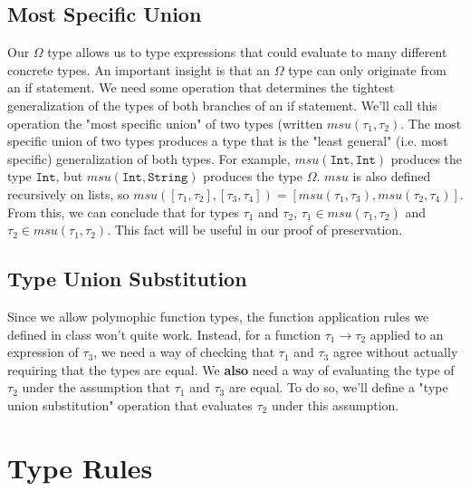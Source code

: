 \documentclass[12pt]{article}
\begin{document}
\subsection{Most Specific Union}
Our $\Omega$ type allows us to type expressions that could evaluate to many different concrete types. An important insight is that an $\Omega$ type can only originate from an if statement. We need some operation that determines the tightest generalization of the types of both branches of an if statement. We'll call this operation the "most specific union" of two types (written $msu(\tau_1, \tau_2)$. The most specific union of two types produces a type that is the "least general" (i.e. most specific) generalization of both types. For example, $msu(\texttt{Int}, \texttt{Int})$ produces the type $\texttt{Int}$, but $msu(\texttt{Int}, \texttt{String})$ produces the type $\Omega$. $msu$ is also defined recursively on lists, so $msu([\tau_1, \tau_2], [\tau_3, \tau_4]) = [msu(\tau_1, \tau_3), msu(\tau_2, \tau_4)]$. From this, we can conclude that for types $\tau_1$ and $\tau_2$, $\tau_1\in msu(\tau_1, \tau_2)$ and $\tau_2\in msu(\tau_1, \tau_2)$. This fact will be useful in our proof of preservation.

\subsection{Type Union Substitution}
Since we allow polymophic function types, the function application rules we defined in class won't quite work. Instead, for a function $\tau_1\rightarrow\tau_2$ applied to an expression of $\tau_3$, we need a way of checking that $\tau_1$ and $\tau_3$ agree without actually requiring that the types are equal. We \textbf{also} need a way of evaluating the type of $\tau_2$ under the assumption that $\tau_1$ and $\tau_3$ are equal. To do so, we'll define a "type union substitution" operation that evaluates $\tau_2$ under this assumption.

\section{Type Rules}

\end{document}
